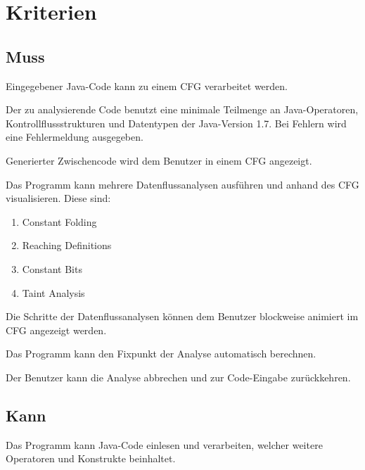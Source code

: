 
\section{Kriterien}

\subsection{Muss}

Eingegebener Java-Code kann zu einem CFG verarbeitet werden.

Der zu analysierende Code benutzt eine minimale Teilmenge an Java-Operatoren, Kontrollflussstrukturen und Datentypen der Java-Version 1.7. Bei Fehlern wird eine Fehlermeldung ausgegeben.

Generierter Zwischencode wird dem Benutzer in einem CFG angezeigt.

Das Programm kann mehrere Datenflussanalysen ausführen und anhand des CFG visualisieren.
Diese sind:\par
\begin{enumerate}[label=(\alph*)]
\item Constant Folding
\item Reaching Definitions
\item Constant Bits
\item Taint Analysis
\end{enumerate}

Die Schritte der Datenflussanalysen können dem Benutzer blockweise animiert im CFG angezeigt werden.

Das Programm kann den Fixpunkt der Analyse automatisch berechnen.

\newpage

Der Benutzer kann die Analyse abbrechen und zur Code-Eingabe zurückkehren.

\subsection{Kann}

Das Programm kann Java-Code einlesen und verarbeiten, welcher weitere Operatoren und Konstrukte beinhaltet.


